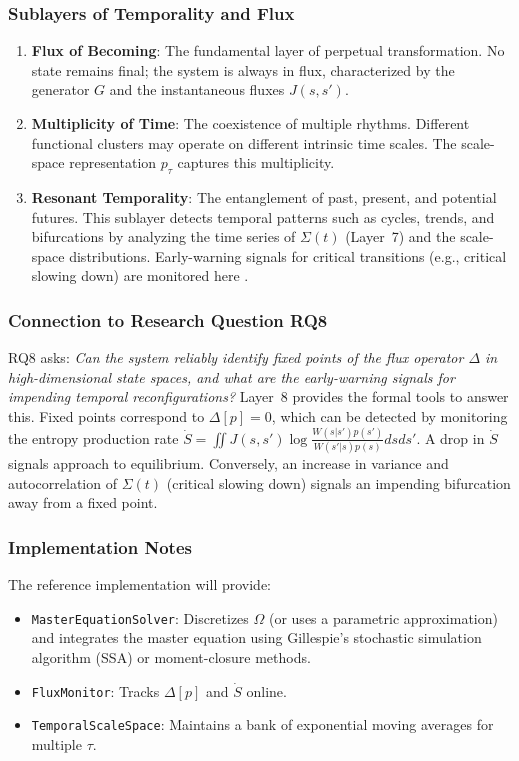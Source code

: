 \subsubsection{Sublayers of Temporality and Flux}
\begin{enumerate}
    \item \textbf{Flux of Becoming}: The fundamental layer of perpetual transformation. No state remains final; the system is always in flux, characterized by the generator $G$ and the instantaneous fluxes $J(s,s')$.
    \item \textbf{Multiplicity of Time}: The coexistence of multiple rhythms. Different functional clusters may operate on different intrinsic time scales. The scale-space representation $p_\tau$ captures this multiplicity.
    \item \textbf{Resonant Temporality}: The entanglement of past, present, and potential futures. This sublayer detects temporal patterns such as cycles, trends, and bifurcations by analyzing the time series of $\Sigma(t)$ (Layer~7) and the scale-space distributions. Early-warning signals for critical transitions (e.g., critical slowing down) are monitored here \cite{scheffer2009}.
\end{enumerate}

\subsubsection{Connection to Research Question RQ8}
RQ8 asks: \emph{Can the system reliably identify fixed points of the flux operator $\Delta$ in high-dimensional state spaces, and what are the early-warning signals for impending temporal reconfigurations?} Layer~8 provides the formal tools to answer this. Fixed points correspond to $\Delta[p]=0$, which can be detected by monitoring the entropy production rate $\dot{S} = \iint J(s,s') \log \frac{W(s|s')p(s')}{W(s'|s)p(s)} ds ds'$. A drop in $\dot{S}$ signals approach to equilibrium. Conversely, an increase in variance and autocorrelation of $\Sigma(t)$ (critical slowing down) signals an impending bifurcation away from a fixed point.

\subsubsection{Implementation Notes}
The reference implementation will provide:
\begin{itemize}
    \item \texttt{MasterEquationSolver}: Discretizes $\Omega$ (or uses a parametric approximation) and integrates the master equation using Gillespie's stochastic simulation algorithm (SSA) or moment-closure methods.
    \item \texttt{FluxMonitor}: Tracks $\Delta[p]$ and $\dot{S}$ online.
    \item \texttt{TemporalScaleSpace}: Maintains a bank of exponential moving averages for multiple $\tau$.
\end{itemize}


